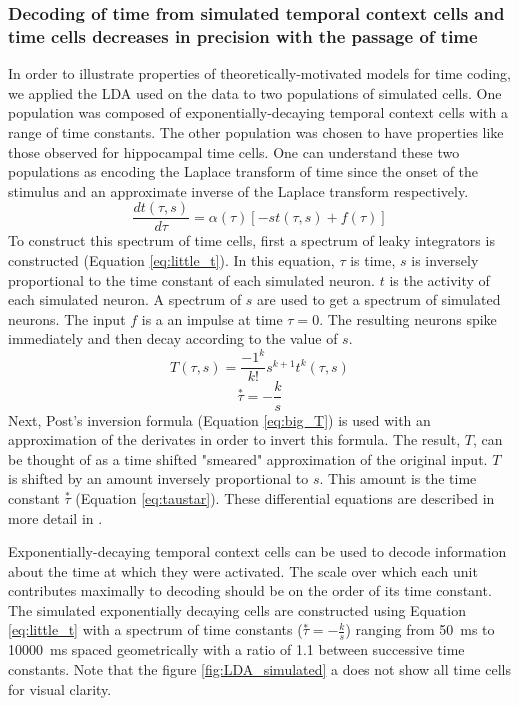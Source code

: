 \documentclass{apa}
\newcommand{\taustar}{\ensuremath{\overset{*}{\tau}}}
\begin{document}
\subsubsection{Decoding of time from simulated temporal context
cells and time cells decreases in precision with the passage of time}
In order to illustrate properties of theoretically-motivated models for time
coding, we applied the LDA used on the data to two populations of simulated
cells.  One population was composed of exponentially-decaying temporal context
cells with a range of time constants.    The other population was chosen to
have properties like those observed for hippocampal time cells.  
One can understand these two populations as encoding the Laplace transform of
time since the onset of the stimulus and an approximate inverse of the Laplace transform
respectively.   
\begin{equation}
\frac{dt(\tau,s)}{d\tau}=\alpha(\tau)\left[-st(\tau,s)+f(\tau)\right]
\label{eq:little_t}
\end{equation}
To construct this spectrum of time cells, first a spectrum of leaky integrators is constructed (Equation \ref{eq:little_t}).  In this equation, $\tau$ is time, $s$ is inversely proportional to the time constant of each simulated neuron. $t$ is the activity of each simulated neuron.
A spectrum of $s$ are used to get a spectrum of simulated neurons. The input $f$ is a an impulse at time $\tau=0$.  The resulting neurons spike immediately and then decay according to the value of $s$.
\begin{equation}
T(\tau,s)=\frac{-1^k}{k!}s^{k+1}t^k(\tau,s)
\label{eq:big_T}
\end{equation}
\begin{equation}
\taustar=-\frac{k}{s}
\label{eq:taustar}
\end{equation}
Next, Post's inversion formula (Equation \eqref{eq:big_T}) 
is used with an approximation of the derivates in order to invert this formula.  
The result, $T$, can be thought of as a time shifted "smeared" approximation of the original input.
$T$ is shifted by an amount inversely proportional to $s$.  This amount is the time constant $\taustar$ (Equation \eqref{eq:taustar}). These differential equations are described in more detail in \cite{ShanHowa12}.

Exponentially-decaying temporal context cells can be used to decode
information about the time at which they were activated.  The scale over which
each unit contributes maximally to decoding should be on the order of its time
constant.
The simulated exponentially decaying cells are constructed using Equation \eqref{eq:little_t} with a 
spectrum of time constants ($\taustar=-\frac{k}{s}$) ranging from 50~ms to 10000~ms spaced geometrically with a ratio of 1.1 between successive time constants.  Note that the figure \ref{fig:LDA_simulated} a does not show all time cells for visual clarity.
\end{document}
